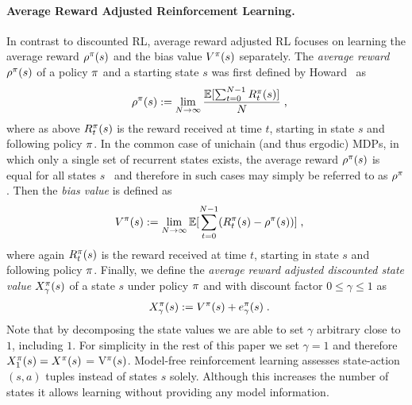\documentclass[envcountsame]{llncs}
\begin{document}
\paragraph{Average Reward Adjusted Reinforcement Learning.} In contrast to discounted RL, average
reward adjusted RL focuses on learning the average reward \(\rho^{\pi}(s)\) and the bias value
\(V^{\pi}(s)\) separately.
%
The \textit{average reward} \(\rho^{\pi}(s)\) of a policy \(\pi\) and a starting state \(s\)
was first defined by Howard~\cite{howard1960dynamic} as
%
\begin{align*}
  \avgrew^{\pol}(s) \defsym \lim_{N \to \infty} \frac{\E [\sum_{t=0}^{N-1}R_{t}^{\pol}(s)]}{N}\tcom
\end{align*}
%
where as above \(R_{t}^{\pi}(s)\) is the reward received at time \(t\), starting in state \(s\) and
following policy \(\pi\). In the common case of unichain (and thus ergodic) MDPs, in which only a
single set of recurrent states exists, the average reward \(\rho^{\pi}(s)\) is equal for all
states
\(s\)~\cite{Mahadevan96_AverageRewardReinforcementLearningFoundationsAlgorithmsAndEmpiricalResults,Puterman94}
and therefore in such cases may simply be referred to as \(\rho^{\pi}\). Then the \textit{bias
  value} is defined as
%
\begin{align*}
  V^{\pol}(s) \defsym \lim_{N \to \infty}{ \E [ \sum_{t=0}^{N-1}(R_{t}^{\pol}(s) - \avgrew^{\pol}(s) )]}\tcom
\end{align*}
%
where again \(R_{t}^{\pi}(s)\) is the reward received at time \(t\), starting in state \(s\) and
following policy \(\pi\). Finally, we define the \textit{average reward adjusted discounted state
  value} $X_{\gamma}^{\pi}(s)$ of a state $s$ under policy $\pi$ and with discount factor
$0 \leqslant \gamma \leqslant 1$ as
%
\begin{align*}
  \X_{\gamma}^{\pol}(s) \defsym V^{\pol}(s) + e_{\gamma}^{\pol}(s)\tpkt
\end{align*}
%
Note that by decomposing the state values we are able to set \(\gamma\) arbitrary close to \(1\),
including \(1\). For simplicity in the rest of this paper we set \(\gamma = 1\) and therefore
\(X_{1}^{\pi}(s) = X^{\pi}(s)\) = V$^{\pi}(s)$. Model-free reinforcement learning assesses
state-action \((s,a)\) tuples instead of states \(s\) solely. Although this increases the number of
states it allows learning without providing any model information.
\end{document}
